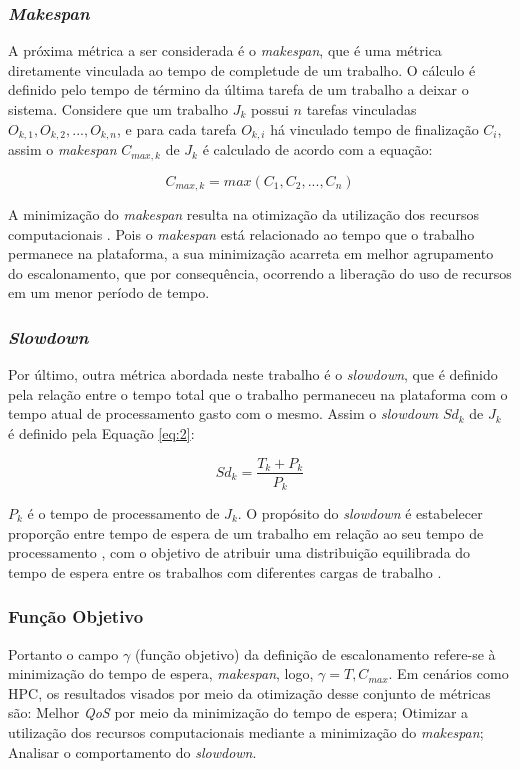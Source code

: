 \subsubsection{\textit{Makespan}}
A próxima métrica a ser considerada é o \textit{makespan}, que é uma métrica diretamente vinculada ao tempo de completude de um trabalho. O cálculo é definido pelo tempo de término da última tarefa de um trabalho a deixar o sistema. Considere que um trabalho $J_k$ possui $n$ tarefas vinculadas $O_{k,1}, O_{k,2}, ..., O_{k,n}$, e para cada tarefa $O_{k,i}$ há vinculado tempo de finalização $C_i$, assim o \textit{makespan} $C_{max, k}$ de $J_k$ é calculado de acordo com a equação:

\begin{equation}
C_{max,k} = max(C_1, C_2, ..., C_n) 
\end{equation}

A minimização do \textit{makespan} resulta na otimização da utilização dos recursos computacionais \cite{pinedo2012scheduling}. Pois o \textit{makespan} está relacionado ao tempo que o trabalho permanece na plataforma, a sua minimização acarreta em melhor agrupamento do escalonamento, que por consequência, ocorrendo a liberação do uso de recursos em um menor período de tempo.

\subsubsection{\textit{Slowdown}}
Por último, outra métrica abordada neste trabalho é o \textit{slowdown}, que é definido pela relação entre o tempo total que o trabalho permaneceu na plataforma com o tempo atual de processamento gasto com o mesmo. Assim o \textit{slowdown} $Sd_k$ de $J_k$  é definido pela Equação \ref{eq:2}:

\begin{equation} \label{eq:2}
Sd_{k} = \frac{T_{k} + P_{k}}{P_{k}}
\end{equation}

\(P_{k}\) é o tempo de processamento de \(J_k\). O propósito do \textit{slowdown} é estabelecer  proporção entre tempo de espera de um trabalho em relação ao seu tempo de processamento \cite{Maccio2018}, com o objetivo de atribuir uma distribuição equilibrada do tempo de espera entre os trabalhos com diferentes cargas de trabalho \cite{CarastanSantos2019}.

\subsubsection{Função Objetivo}
Portanto o campo $\gamma$ (função objetivo) da definição de escalonamento refere-se à minimização do tempo de espera, \textit{makespan}, logo, $\gamma = T, C_{max}$. Em cenários como \ac{HPC}, os resultados visados por meio da otimização desse conjunto de métricas são: Melhor \textit{QoS} por meio da minimização do tempo de espera; Otimizar a utilização dos recursos computacionais mediante a minimização do \textit{makespan}; Analisar o comportamento do \textit{slowdown}.

